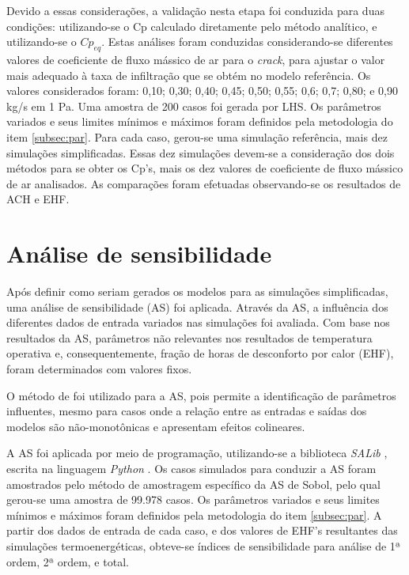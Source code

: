 \documentclass[brazil,hardcopy,openany,a5paper]{ufscthesis}
\begin{document}
		Devido a essas considerações, a validação nesta etapa foi conduzida para duas condições: utilizando-se o Cp calculado diretamente pelo método analítico, e utilizando-se o $Cp_{eq}$.		
		Estas análises foram conduzidas considerando-se diferentes valores de coeficiente de fluxo mássico de ar para o \textit{crack}, para ajustar o valor mais adequado à taxa de infiltração que se obtém no modelo referência. Os valores considerados foram: 0,10; 0,30; 0,40; 0,45; 0,50; 0,55; 0,6; 0,7; 0,80; e 0,90 kg/s em 1 Pa.
		Uma amostra de 200 casos foi gerada por LHS.
		Os parâmetros variados e seus limites mínimos e máximos foram definidos pela metodologia do item \ref{subsec:par}.
		Para cada caso, gerou-se uma simulação referência, mais dez simulações simplificadas. Essas dez simulações devem-se a consideração dos dois métodos para se obter os Cp's, mais os dez valores de coeficiente de fluxo mássico de ar analisados. As comparações foram efetuadas observando-se os resultados de ACH e EHF. 
		
		\section{Análise de sensibilidade}
		
		Após definir como seriam gerados os modelos para as simulações simplificadas, uma análise de sensibilidade (AS) foi aplicada. Através da AS, a influência dos diferentes dados de entrada variados nas simulações foi avaliada. Com base nos resultados da AS, parâmetros não relevantes nos resultados de temperatura operativa e, consequentemente, fração de horas de desconforto por calor (EHF), foram determinados com valores fixos.
		
		O método de  \cite{Sobol1993} foi utilizado para a AS, pois permite a identificação de parâmetros influentes, mesmo para casos onde a relação entre as entradas e saídas dos modelos são não-monotônicas e apresentam efeitos colineares.
		
		A AS foi aplicada por meio de programação, utilizando-se a biblioteca \textit{SALib} \cite{Herman2017}, escrita na linguagem \textit{Python} \cite{Python}.
		Os casos simulados para conduzir a AS foram amostrados pelo método de amostragem específico da AS de Sobol, pelo qual gerou-se uma amostra de 99.978 casos.
		Os parâmetros variados e seus limites mínimos e máximos foram definidos pela metodologia do item \ref{subsec:par}. 
		A partir dos dados de entrada de cada caso, e dos valores de EHF's resultantes das simulações termoenergéticas, obteve-se índices de sensibilidade para análise de 1ª ordem, 2ª ordem, e total.
		
\end{document}
